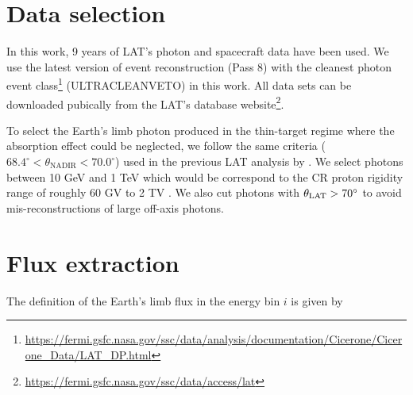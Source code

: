 \section{Data selection}
In this work, 9 years of
LAT's photon and spacecraft data have been used.
We use the latest version of event reconstruction (Pass 8) with the
cleanest photon event class\footnote{\url{https://fermi.gsfc.nasa.gov/ssc/data/analysis/documentation/Cicerone/Cicerone_Data/LAT_DP.html}}
(ULTRACLEANVETO) in this work.
All data sets can be downloaded pubically
from the LAT's database website\footnote{\url{https://fermi.gsfc.nasa.gov/ssc/data/access/lat}}.


To select the Earth's limb photon produced in the thin-target regime
where the absorption effect could be neglected, we follow the same
criteria ($68.4^\circ < \theta_\text{NADIR} < 70.0^\circ$)
used in the previous LAT analysis by \cite{FermiEarth14}.
We select photons between 10 GeV and 1 TeV which would be
correspond to the CR proton rigidity range of roughly 60 GV
to 2 TV \citep{FermiEarth14}. We also cut photons with
$\theta_{\rm LAT}>70^\circ$ to avoid mis-reconstructions of
large off-axis photons.


\section{Flux extraction}

The definition of the Earth's limb flux in the energy bin $i$ is given by

